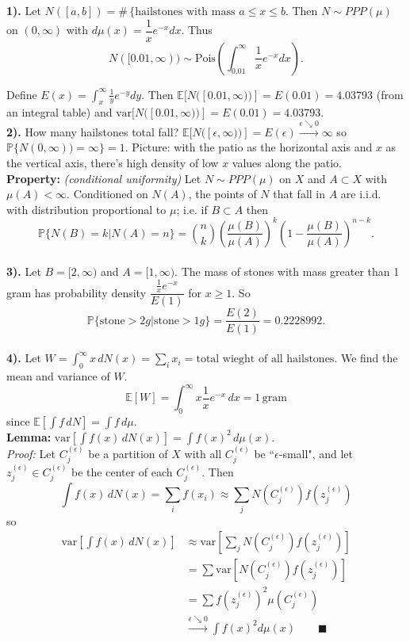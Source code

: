 \documentclass[a4paper, 12pt]{article}
\begin{document}
\textbf{1).} Let $N([a,b])=\#\,\{\textrm{hailstones with mass $a\leq x\leq b$}$. Then $N\sim PPP(\mu)$ on $(0,\infty)$ with $d\mu(x)=\dfrac{1}{x}e^{-x}dx$. Thus
$$N([0.01,\infty))\sim\textrm{Pois}\left( \int_{0.01}^\infty \frac{1}{x}e^{-x}dx\right).$$

Define $E(x)=\int_x^\infty\frac{1}{y}e^{-y}dy$. Then $\mathbb{E}[N([0.01,\infty))]=E(0.01)=4.03793$ (from an integral table) and $\textrm{var}[N([0.01,\infty))]=E(0.01)=4.03793$.\\

\textbf{2).} How many hailstones total fall? $\mathbb{E}[N([\epsilon,\infty))]=E(\epsilon)\xrightarrow{\epsilon\searrow0}\infty$ so $\mathbb{P}\{N(0,\infty))=\infty\}=1$. Picture: with the patio as the horizontal axis and $x$ as the vertical axis, there's high density of low $x$ values along the patio.\\

\textbf{Property:} \emph{(conditional uniformity)} Let $N\sim PPP(\mu)$ on $X$ and $A\subset X$ with $\mu(A)<\infty$. Conditioned on $N(A)$, the points of $N$ that fall in $A$ are i.i.d. with distribution proportional to $\mu$; i.e. if $B\subset A$ then $$\mathbb{P}\{N(B)=k | N(A)=n\} = {{n}\choose{k}} \left(\frac{\mu(B)}{\mu(A)}\right)^k\left( 1-\frac{\mu(B)}{\mu(A)}\right)^{n-k}.$$\\

\textbf{3).} Let $B=[2,\infty)$ and $A=[1,\infty)$. The mass of stones with mass greater than 1 gram has probability density $\dfrac{\frac{1}{x}e^{-x}}{E(1)}$ for $x\geq 1$. So $$\mathbb{P}\{\textrm{stone}>2g|\textrm{stone}>1g\}=\dfrac{E(2)}{E(1)}=0.2228992.$$\\

\textbf{4).} Let $W=\int_0^\infty x\,dN(x)=\sum_ix_i=\textrm{total wieght of all hailstones}$. We find the mean and variance of $W$. $$\mathbb{E}[W]=\int_0^\infty x\frac{1}{x}e^{-x}\,dx=1\,\textrm{gram}$$
since $\mathbb{E}[\int f\,dN]=\int f\,d\mu$.\\

\textbf{Lemma:} $\textrm{var}[\int f(x)\,dN(x)]=\int f(x)^2\,d\mu(x)$.\\

\textit{Proof:} Let $C_j^{(\epsilon)}$ be a partition of $X$ with all $C_j^{(\epsilon)}$ be ``$\epsilon$-small", and let $z_j^{(\epsilon)}\in C_j^{(\epsilon)}$ be the center of each $C_j^{(\epsilon)}$. Then
$$\int f(x)\,dN(x)=\sum_if(x_i)\approx\sum_j N(C_j^{(\epsilon)})f(z_j^{(\epsilon)})$$
so 
\[\begin{split}
\textrm{var}\left[  \int f(x)\,dN(x) \right] &\approx \textrm{var}\left[\sum_j N(C_j^{(\epsilon)})f(z_j^{(\epsilon)}) \right]\\
&=\sum\textrm{var}[ N(C_j^{(\epsilon)})f(z_j^{(\epsilon)})]\\
&=\sum f(z_j^{(\epsilon)})^2\mu(C_j^{(\epsilon)})\\
&\xrightarrow{\epsilon\searrow0}\int f(x)^2d\mu(x)   \qquad \blacksquare
\end{split}\]
\end{document}
